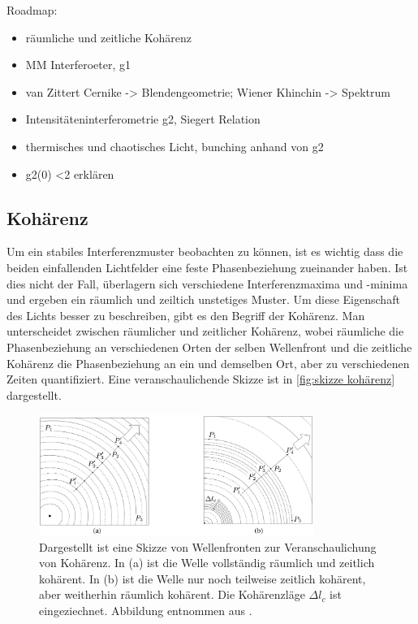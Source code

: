 Roadmap:
\begin{itemize}
    \item räumliche und zeitliche Kohärenz
    \item MM Interferoeter, g1
    \item van Zittert Cernike -> Blendengeometrie; Wiener Khinchin -> Spektrum
    \item Intensitäteninterferometrie g2, Siegert Relation
    \item thermisches und chaotisches Licht, bunching anhand von g2
    \item g2(0) <2 erklären
\end{itemize}

\subsection{Kohärenz}
\label{ssec:Kohärenz}
Um ein stabiles Interferenzmuster beobachten zu können, ist es wichtig dass die beiden einfallenden Lichtfelder eine feste Phasenbeziehung zueinander haben. 
Ist dies nicht der Fall, überlagern sich verschiedene Interferenzmaxima und -minima und ergeben ein räumlich und zeiltich unstetiges Muster. 
Um diese Eigenschaft des Lichts besser zu beschreiben, gibt es den Begriff der Kohärenz.
Man unterscheidet zwischen räumlicher und zeitlicher Kohärenz, wobei räumliche die Phasenbeziehung an verschiedenen Orten der selben Wellenfront und die zeitliche Kohärenz die Phasenbeziehung an ein und demselben Ort, aber zu verschiedenen Zeiten quantifiziert.
Eine veranschaulichende Skizze ist in \autoref{fig:skizze kohärenz} dargestellt.
\begin{figure}[htbp]
    \centering
    \includegraphics[width=0.8\textwidth]{images/Theorie/Hecht_9.6.png}
    \caption{Dargestellt ist eine Skizze von Wellenfronten zur Veranschaulichung von Kohärenz. In (a) ist die Welle vollständig räumlich und zeitlich kohärent. In (b) ist die Welle nur noch teilweise zeitlich kohärent, aber weitherhin räumlich kohärent. Die Kohärenzläge $\Delta l_c$ ist eingeziechnet. Abbildung entnommen aus \cite{hecht_optik_2018}.}
    \label{fig:skizze kohärenz}
\end{figure}
